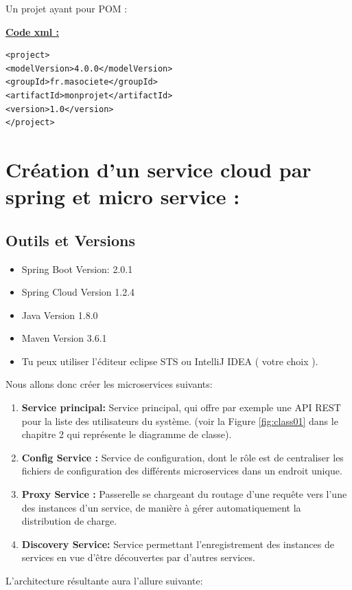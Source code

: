      Un projet ayant pour POM :
     
     \textbf{\underline{Code xml :}}\\
    \lstset{language=XML}
\begin{lstlisting}
<project>
<modelVersion>4.0.0</modelVersion>
<groupId>fr.masociete</groupId>
<artifactId>monprojet</artifactId>
<version>1.0</version>
</project>
\end{lstlisting}
     
\section{Création d'un service cloud par spring et micro service :}

\subsection{Outils et Versions}

\begin{itemize}
\item Spring Boot Version: 2.0.1
\item Spring Cloud Version 1.2.4
\item Java Version 1.8.0 
\item Maven Version 3.6.1
\item  Tu peux utiliser l'éditeur eclipse STS ou IntelliJ IDEA ( votre choix ).
\end{itemize}



Nous allons donc créer les microservices suivants:
\begin{enumerate}
	
\item 	\textbf{Service principal:} Service principal, qui offre par exemple une API REST pour  la liste des utilisateurs du système.   (voir la Figure \ref{fig:class01} dans le chapitre 2 qui représente le diagramme de classe).
	
\item 	\textbf{Config Service :} Service de configuration, dont le rôle est de centraliser les fichiers de configuration des différents microservices dans un endroit unique.
	
\item 		\textbf{Proxy Service :} Passerelle se chargeant du routage d'une requête vers l'une des instances d'un service, de manière à gérer automatiquement la distribution de charge.
	
\item 		\textbf{Discovery Service:} Service permettant l'enregistrement des instances de services en vue d'être découvertes par d'autres services.
\end{enumerate}
L'architecture résultante aura l'allure suivante:


